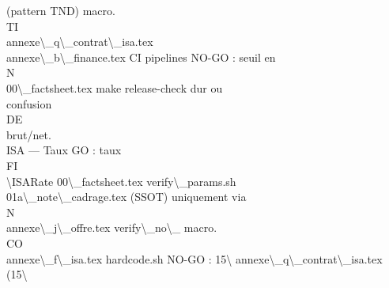 \documentclass[12pt,landscape,a4paper]{article}
\begin{document}
(pattern TND)          macro.\\
\vspace{0.5em}
\vspace{0.5em}
\vspace{0.5em}
\vspace{0.5em}
TI\\
annexe\textbackslash{}_q\textbackslash{}_contrat\textbackslash{}_isa.tex\\
annexe\textbackslash{}_b\textbackslash{}_finance.tex       CI pipelines           NO-GO : seuil en\\
\vspace{0.5em}
\vspace{0.5em}
\vspace{0.5em}
\vspace{0.5em}
N\\
00\textbackslash{}_factsheet.tex           make release-check     dur ou\\
confusion\\
\vspace{0.5em}
\vspace{0.5em}
\vspace{0.5em}
\vspace{0.5em}
DE\\
brut/net.\\
ISA — Taux                                                                      GO : taux\\
\vspace{0.5em}
\vspace{0.5em}
\vspace{0.5em}
\vspace{0.5em}
FI\\
\textbackslash{}ISARate        00\textbackslash{}_factsheet.tex           verify\textbackslash{}_params.sh\\
01a\textbackslash{}_note\textbackslash{}_cadrage.tex       (SSOT)                 uniquement via\\
\vspace{0.5em}
\vspace{0.5em}
N\\
annexe\textbackslash{}_j\textbackslash{}_offre.tex         verify\textbackslash{}_no\textbackslash{}_             macro.\\
CO\\
annexe\textbackslash{}_f\textbackslash{}_isa.tex           hardcode.sh            NO-GO : 15\textbackslash{}%
annexe\textbackslash{}_q\textbackslash{}_contrat\textbackslash{}_isa.tex   (15\textbackslash{}%
\end{document}
